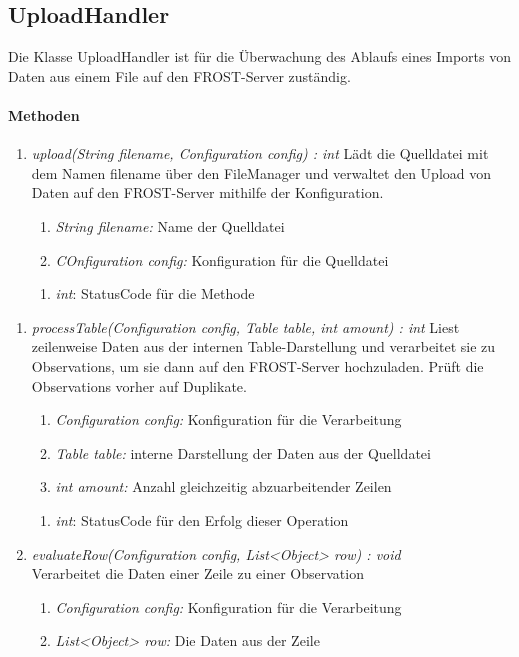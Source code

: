 \subsection*{UploadHandler}\label{uploadHandler}
Die Klasse UploadHandler ist für die Überwachung des Ablaufs eines Imports von Daten aus einem File auf den FROST-Server zuständig.

\paragraph{Methoden}
\begin{enumerate}[+]
\item \textit{upload(String filename, Configuration config) : int}
Lädt die Quelldatei mit dem Namen filename über den FileManager und verwaltet den Upload von Daten auf den FROST-Server mithilfe der Konfiguration.
\begin{enumerate}[$\bullet$]
\item \textit{String filename:} Name der Quelldatei
\item \textit{COnfiguration config:} Konfiguration für die Quelldatei 
\end{enumerate}
\vspace{-0.2cm}
\begin{enumerate}[$\circ$]
\item \textit{int}: StatusCode für die Methode
\end{enumerate}
\end{enumerate}

\begin{enumerate}[$-$]
\item \textit{processTable(Configuration config, Table table, int amount) : int} Liest zeilenweise Daten aus der internen Table-Darstellung und verarbeitet sie zu Observations, um sie dann auf den FROST-Server hochzuladen. Prüft die Observations vorher auf Duplikate.
\begin{enumerate}[$\bullet$]
\item \textit{Configuration config:} Konfiguration für die Verarbeitung
\item \textit{Table table:} interne Darstellung der Daten aus der Quelldatei
\item \textit{int amount:} Anzahl gleichzeitig abzuarbeitender Zeilen
\end{enumerate}
\vspace{-0.2cm}
\begin{enumerate}[$\circ$]
\item \textit{int}: StatusCode für den Erfolg dieser Operation
\end{enumerate}


\item \textit{evaluateRow(Configuration config, List<Object> row) : void}\\
Verarbeitet die Daten einer Zeile zu einer Observation
\begin{enumerate}[$\bullet$]
\item \textit{Configuration config:} Konfiguration für die Verarbeitung
\item \textit{List<Object> row:} Die Daten aus der Zeile
\end{enumerate}
\end{enumerate}